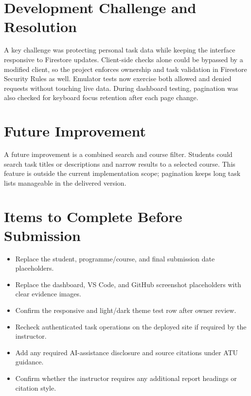 \documentclass[11pt,a4paper]{article}
\begin{document}
\section{Development Challenge and Resolution}

A key challenge was protecting personal task data while keeping the interface responsive to Firestore updates. Client-side checks alone could be bypassed by a modified client, so the project enforces ownership and task validation in Firestore Security Rules as well. Emulator tests now exercise both allowed and denied requests without touching live data. During dashboard testing, pagination was also checked for keyboard focus retention after each page change.

\section{Future Improvement}

A future improvement is a combined search and course filter. Students could search task titles or descriptions and narrow results to a selected course. This feature is outside the current implementation scope; pagination keeps long task lists manageable in the delivered version.

\section*{Items to Complete Before Submission}

\begin{itemize}
  \item Replace the student, programme/course, and final submission date placeholders.
  \item Replace the dashboard, VS Code, and GitHub screenshot placeholders with clear evidence images.
  \item Confirm the responsive and light/dark theme test row after owner review.
  \item Recheck authenticated task operations on the deployed site if required by the instructor.
  \item Add any required AI-assistance disclosure and source citations under ATU guidance.
  \item Confirm whether the instructor requires any additional report headings or citation style.
\end{itemize}
\end{document}
